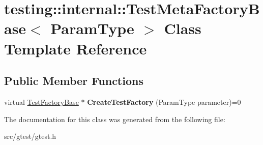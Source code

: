 \hypertarget{classtesting_1_1internal_1_1_test_meta_factory_base}{}\section{testing\+:\+:internal\+:\+:Test\+Meta\+Factory\+Base$<$ Param\+Type $>$ Class Template Reference}
\label{classtesting_1_1internal_1_1_test_meta_factory_base}
\subsection*{Public Member Functions}
\begin{DoxyCompactItemize}
\item 
\mbox{\label{classtesting_1_1internal_1_1_test_meta_factory_base_a853daab362740bcac55e180128d564ef}} 
virtual \mbox{\hyperlink{classtesting_1_1internal_1_1_test_factory_base}{Test\+Factory\+Base}} $\ast$ {\bfseries Create\+Test\+Factory} (Param\+Type parameter)=0
\end{DoxyCompactItemize}


The documentation for this class was generated from the following file\+:\begin{DoxyCompactItemize}
\item 
src/gtest/gtest.\+h\end{DoxyCompactItemize}
